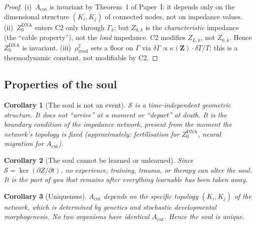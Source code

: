 \documentclass[aps,pre,twocolumn,superscriptaddress,floatfix]{revtex4-2}
\newtheorem{corollary}{Corollary}
\newcommand{\Acut}{A_{\text{cut}}}
\begin{document}
\begin{proof}
(i)~$\Acut$ is invariant by Theorem~1 of Paper~I: it depends
only on the dimensional structure $(K_i,K_j)$ of connected
nodes, not on impedance values.
(ii)~$Z_0^{\text{DNA}}$ enters C2 only through $\Gamma_k$;
but $Z_{0,k}$ is the \emph{characteristic} impedance
(the ``cable property''), not the \emph{load} impedance.
C2 modifies $Z_{L,k}$, not $Z_{0,k}$.
Hence $Z_0^{\text{DNA}}$ is invariant.
(iii)~$\rho_{\text{irred}}^2$ sets a floor on $\Gamma$ via
$\delta\Gamma\propto\kappa(\mathbf{Z})\cdot\delta T/T$;
this is a thermodynamic constant, not modifiable by C2.
\end{proof}

\subsection{Properties of the soul}

\begin{corollary}[The soul is not an event]
$\mathcal{S}$ is a time-independent geometric structure.
It does not ``arrive'' at a moment or ``depart'' at death.
It is the boundary condition of the impedance network,
present from the moment the network's topology is fixed
(approximately: fertilisation for $Z_0^{\text{DNA}}$,
neural migration for $\Acut$).
\end{corollary}

\begin{corollary}[The soul cannot be learned or unlearned]
Since $\mathcal{S}=\ker(\partial Z/\partial t)$, no
experience, training, trauma, or therapy can alter the soul.
It is the part of you that remains after everything learnable
has been taken away.
\end{corollary}

\begin{corollary}[Uniqueness]
$\Acut$ depends on the specific topology $(K_i,K_j)$ of the
network, which is determined by genetics and stochastic
developmental morphogenesis.
No two organisms have identical $\Acut$.
Hence the soul is unique.
\end{corollary}
\end{document}
